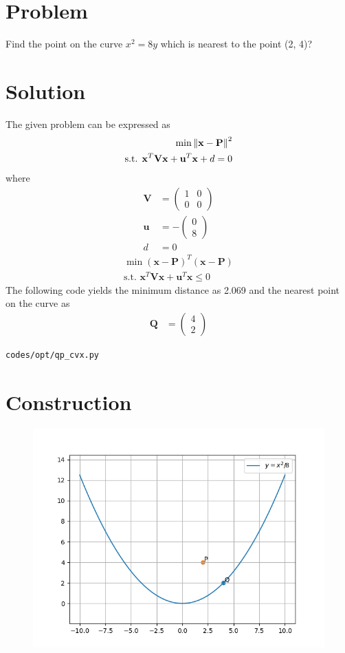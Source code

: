 \documentclass[10pt, a4paper]{article}
\title{\mytitle}
\author{\myauthor\hspace{1em}\\\contact\\FWC22012\hspace{6.5em}IITH\hspace{0.5em}\mymodule\hspace{6em}ASSIGN-8}
\date{}
\newcommand{\myvec}[1]{\ensuremath{\begin{pmatrix}#1\end{pmatrix}}}
\let\vec\mathbf
\begin{document}
	\maketitle
\section{Problem}
Find the point on the curve \begin{math}
x^2 =8y
\end{math} which is nearest to the point (2, 4)?
\section{Solution}
The given problem can be expressed as
\begin{align}
\min\norm{\vec{x}-\vec{P}}^2
\\
\text{s.t. }\vec{x}^T\vec{V}\vec{x} + \vec{u}^T\vec{x}  +d = 0
\end{align}
where
\begin{align}
\vec{V} &= \myvec{1 & 0\\0 & 0}
\\
\vec{u} &= -\myvec{0 \\ 8}
\\
d &= 0
\end{align}
\begin{align}
\min{(\vec{x}-\vec{P})}^T{(\vec{x}-\vec{P})}
\\
\text{s.t. }\vec{x}^T\vec{V}\vec{x} + \vec{u}^T\vec{x}  \le 0
\end{align}
The following code yields the minimum distance as 2.069 and the nearest point on the curve as
\begin{align}
\vec{Q} &= \myvec{4\\2}
\end{align}
\begin{lstlisting}
codes/opt/qp_cvx.py
\end{lstlisting}
\section{Construction}
\begin{figure}[h]
\includegraphics[scale=0.5]{aopp.png} 
\end{figure}
\end{document}

